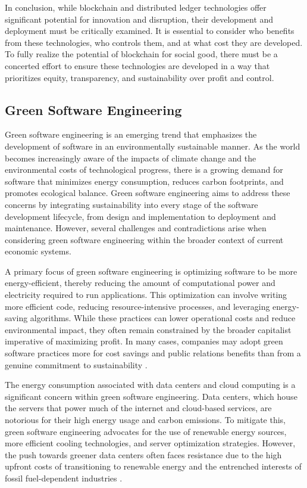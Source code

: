 \begin{refsection}
In conclusion, while blockchain and distributed ledger technologies offer significant potential for innovation and disruption, their development and deployment must be critically examined. It is essential to consider who benefits from these technologies, who controls them, and at what cost they are developed. To fully realize the potential of blockchain for social good, there must be a concerted effort to ensure these technologies are developed in a way that prioritizes equity, transparency, and sustainability over profit and control.

\subsection{Green Software Engineering}

Green software engineering is an emerging trend that emphasizes the development of software in an environmentally sustainable manner. As the world becomes increasingly aware of the impacts of climate change and the environmental costs of technological progress, there is a growing demand for software that minimizes energy consumption, reduces carbon footprints, and promotes ecological balance. Green software engineering aims to address these concerns by integrating sustainability into every stage of the software development lifecycle, from design and implementation to deployment and maintenance. However, several challenges and contradictions arise when considering green software engineering within the broader context of current economic systems.

A primary focus of green software engineering is optimizing software to be more energy-efficient, thereby reducing the amount of computational power and electricity required to run applications. This optimization can involve writing more efficient code, reducing resource-intensive processes, and leveraging energy-saving algorithms. While these practices can lower operational costs and reduce environmental impact, they often remain constrained by the broader capitalist imperative of maximizing profit. In many cases, companies may adopt green software practices more for cost savings and public relations benefits than from a genuine commitment to sustainability \cite[pp.~100-103]{karl2016ecosocialism}.

The energy consumption associated with data centers and cloud computing is a significant concern within green software engineering. Data centers, which house the servers that power much of the internet and cloud-based services, are notorious for their high energy usage and carbon emissions. To mitigate this, green software engineering advocates for the use of renewable energy sources, more efficient cooling technologies, and server optimization strategies. However, the push towards greener data centers often faces resistance due to the high upfront costs of transitioning to renewable energy and the entrenched interests of fossil fuel-dependent industries \cite[pp.~145-148]{mcmurtry1999life}.


\end{refsection}
